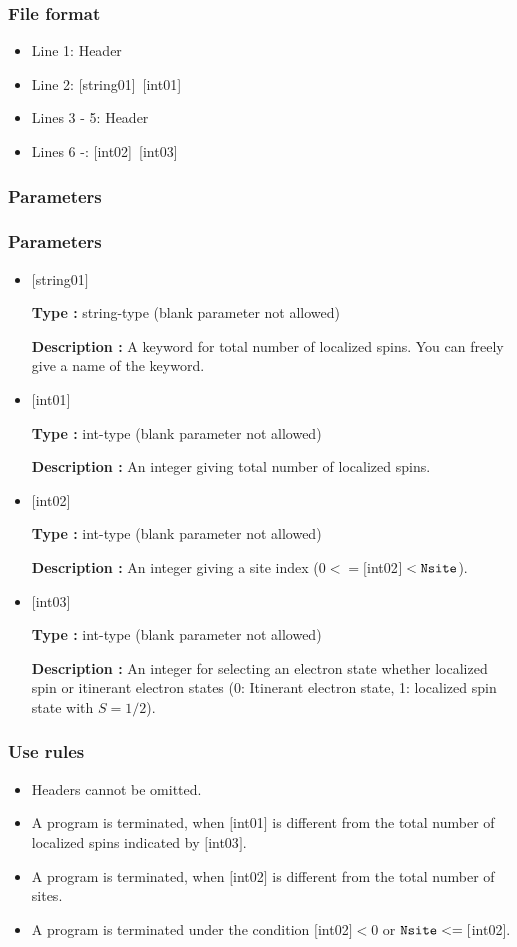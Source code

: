 \subsubsection{File format}
\begin{itemize}
   \item  Line 1:  Header
   \item  Line 2:   [string01]~[int01]
   \item  Lines 3 - 5:  Header
   \item  Lines 6 -:  [int02]~[int03]
  \end{itemize}
 \subsubsection{Parameters}
 \subsubsection{Parameters}
 \begin{itemize}


 \item  $[$string01$]$

 {\bf Type :} string-type (blank parameter not allowed)

{\bf Description :} A keyword for total number of localized spins. You can freely give a name of the keyword.


  \item  $[$int01$]$

 {\bf Type :} int-type (blank parameter not allowed)

{\bf Description :} An integer giving total number of localized spins.

 
  \item  $[$int02$]$

 {\bf Type :} int-type (blank parameter not allowed)

{\bf Description :} An integer giving a site index ($0<= [$int02$] <\verb|Nsite|$).

 
  \item  $[$int03$]$

 {\bf Type :} int-type (blank parameter not allowed)

{\bf Description :} An integer for selecting an electron state whether localized spin or itinerant electron states (0: Itinerant electron state, 1: localized spin state with $S=1/2$).
 \end{itemize}

\subsubsection{Use rules}
\begin{itemize}
\item Headers cannot be omitted. 
\item A program is terminated, when $[$int01$]$ is different from the total number of localized spins indicated by $[$int03$]$.
\item A program is terminated, when $[$int02$]$ is different from the total number of sites.
\item A program is terminated under the condition $[$int02$]<0$ or $\verb|Nsite|<=[$int02$]$.
\end{itemize}

